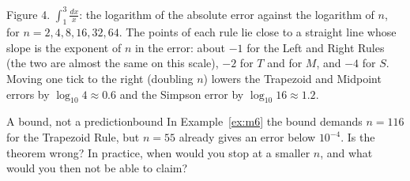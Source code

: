 \documentclass[11pt]{article}
\begin{document}
\begin{center}
\end{center}
\begin{center}\small Figure 4. $\int_1^3\frac{dx}x$: the logarithm of the absolute error against the logarithm of $n$, for $n=2,4,8,16,32,64$. The points of each rule lie close to a straight line whose slope is the exponent of $n$ in the error: about $-1$ for the Left and Right Rules (the two are almost the same on this scale), $-2$ for $T$ and for $M$, and $-4$ for $S$. Moving one tick to the right (doubling $n$) lowers the Trapezoid and Midpoint errors by $\log_{10}4\approx0.6$ and the Simpson error by $\log_{10}16\approx1.2$.\end{center}

\begin{think}{A bound, not a prediction}{bound}
In Example~\ref{ex:m6} the bound demands $n=116$ for the Trapezoid Rule, but $n=55$ already gives an error below $10^{-4}$. Is the theorem wrong? In practice, when would you stop at a smaller $n$, and what would you then not be able to claim?
\end{think}

\end{document}
